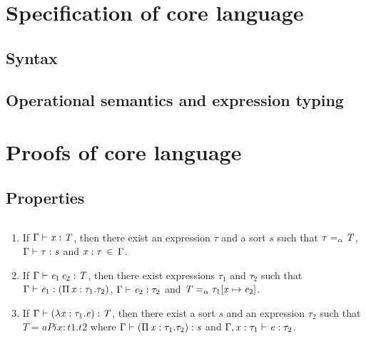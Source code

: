\section{Specification of core language}

\subsection{Syntax}
\gram{\otte\ottinterrule
        \otts\ottinterrule
        \ottG\ottinterrule
        \ottv}

\subsection{Operational semantics and expression typing}
\ottdefnstep{}
\ottusedrule{\ottdruleSXXMu{}}
\ottdefnexpr{}
\ottusedrule{\ottdruleTXXMu{}}

\section{Proofs of core language}
\subsection{Properties}
\begin{lem}\label{lem:gen}
$\quad$
\begin{enumerate}
	\item If $\Gamma  \vdash  \mathit{x}  :  \mathit{T}$, then there exist an expression $\tau$ and a sort $s$ such that $ \tau  =_{\alpha}  \mathit{T} $, $\Gamma  \vdash  \tau  :  \mathit{s}$ and $\mathit{x}  :  \tau \, \in \, \Gamma$.
	\item If $\Gamma  \vdash  \mathit{e_{{\mathrm{1}}}} \, \mathit{e_{{\mathrm{2}}}}  :  \mathit{T}$, then there exist expressions $\tau_{{\mathrm{1}}}$ and $\tau_{{\mathrm{2}}}$ such that $\Gamma  \vdash  \mathit{e_{{\mathrm{1}}}}  :  (  \Pi \, \mathit{x}  :  \tau_{{\mathrm{1}}}  .  \tau_{{\mathrm{2}}}  )$, $\Gamma  \vdash  \mathit{e_{{\mathrm{2}}}}  :  \tau_{{\mathrm{2}}}$ and $ \mathit{T}  =_{\alpha}  \tau_{{\mathrm{1}}}  [  \mathit{x}  \mapsto  \mathit{e_{{\mathrm{2}}}}  ] $.
	\item If $\Gamma  \vdash  (  \lambda  \mathit{x}  :  \tau_{{\mathrm{1}}}  .  \mathit{e}  )  :  \mathit{T}$, then there exist a sort $s$ and an expression $\tau_{{\mathrm{2}}}$ such that $T =a Pi x:t1.t2$ where $\Gamma  \vdash  (  \Pi \, \mathit{x}  :  \tau_{{\mathrm{1}}}  .  \tau_{{\mathrm{2}}}  )  :  \mathit{s}$ and $\Gamma  ,  \mathit{x}  :  \tau_{{\mathrm{1}}}  \vdash  \mathit{e}  :  \tau_{{\mathrm{2}}}$.
\end{enumerate}
\end{lem}

